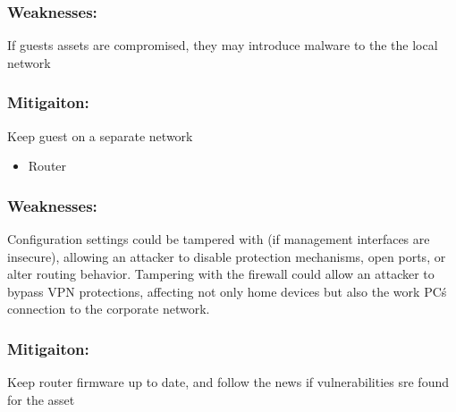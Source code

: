 \documentclass[
	letterpaper, %
	10pt, %
	unnumberedsections, %
	twoside, %
]{APAAssignment}
\begin{document}
\begin{singlespace}
	\subsubsection{Weaknesses:} If guests assets are compromised, they may introduce malware to the the local network  
	\subsubsection{Mitigaiton:} Keep guest on a separate network
	
	\begin{itemize}
		\item Router
	\end{itemize}
	
	\subsubsection{Weaknesses:} Configuration settings could be tampered with (if management interfaces are insecure), allowing an attacker to disable protection mechanisms, open ports, or alter routing behavior. Tampering with the firewall could allow an attacker to bypass VPN protections, affecting not only home devices but also the work PC\'s connection to the corporate network.
	\subsubsection{Mitigaiton:} Keep router firmware up to date, and follow the news if vulnerabilities sre found for the asset
	
	
\end{singlespace}
	
\end{document}
